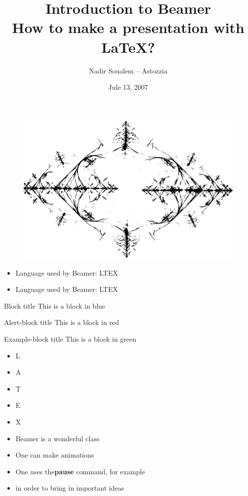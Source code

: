 \documentclass{beamer}
\title[Make a LaTeX presentation using Beamer]{Introduction  to Beamer\\How to make a presentation with LaTeX?}
\author{Nadir Soualem -- Astozzia}
\institute{Math-linux.com}
\date{Jule 13, 2007}
\begin{document}
\begin{frame}
\begin{figure}
\includegraphics[scale=0.2]{test2}
\end{figure}

\end{frame}

\begin{frame}

\begin{itemize}
\item Language used by Beamer: LTEX
\item Language used by Beamer: LTEX
\end{itemize}

\begin{block}{Block title}
This is a block in blue
\end{block}

\begin{alertblock}{Alert-block title}
This is a block in red
\end{alertblock}

\begin{exampleblock}{Example-block title}
This is a block in green
\end{exampleblock}
\end{frame}

\begin{frame}
\begin{itemize}[<+->]
\item L
\item A
\item T
\item E
\item X
\end{itemize}
\end{frame}

\begin{frame}
\begin{itemize}
\item Beamer is a wonderful class
\pause \item One can make animations
\pause \item One uses the\textbf{pause} command, for example
\pause \item in order to bring in important ideas
\end{itemize}
\end{frame}
\end{document}
